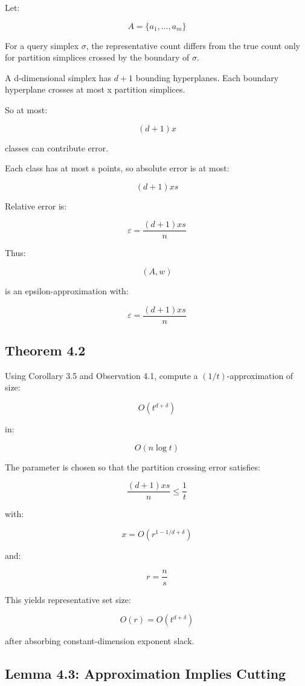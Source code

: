 \documentclass[
  11pt,
]{article}
\begin{document}
Let:

\[
A=\lbrace a_1,\ldots,a_m \rbrace
\]

For a query simplex \(\sigma\), the representative count differs from
the true count only for partition simplices crossed by the boundary of
\(\sigma\).

A d-dimensional simplex has \(d+1\) bounding hyperplanes. Each boundary
hyperplane crosses at most x partition simplices.

So at most:

\[
(d+1)x
\]

classes can contribute error.

Each class has at most s points, so absolute error is at most:

\[
(d+1)xs
\]

Relative error is:

\[
\varepsilon=\frac{(d+1)xs}{n}
\]

Thus:

\[
(A,w)
\]

is an epsilon-approximation with:

\[
\varepsilon=\frac{(d+1)xs}{n}
\]

\hypertarget{theorem-4.2}{%
\subsection{Theorem 4.2}\label{theorem-4.2}}

Using Corollary 3.5 and Observation 4.1, compute a
\((1/t)\)-approximation of size:

\[
O(t^{d+\delta})
\]

in:

\[
O(n\log t)
\]

The parameter is chosen so that the partition crossing error satisfies:

\[
\frac{(d+1)xs}{n}\le \frac{1}{t}
\]

with:

\[
x=O(r^{1-1/d+\delta})
\]

and:

\[
r=\frac{n}{s}
\]

This yields representative set size:

\[
O(r)=O(t^{d+\delta})
\]

after absorbing constant-dimension exponent slack.

\hypertarget{lemma-4.3-approximation-implies-cutting}{%
\subsection{Lemma 4.3: Approximation Implies
Cutting}\label{lemma-4.3-approximation-implies-cutting}}
\end{document}
